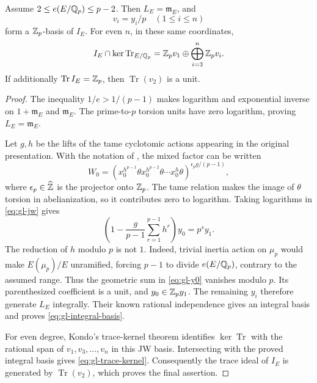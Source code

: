 \begin{lemma}
\label{lem:gl-integral-basis}
Assume $2\le e(E/\mathbb Q_p)\le p-2$. Then
$L_E=\mathfrak m_E$, and
\begin{equation}\label{eq:gl-integral-basis}
 v_i=y_i/p\quad(1\le i\le n)
\end{equation}
form a $\mathbb Z_p$-basis of $I_E$.
For even $n$, in these same coordinates,
\begin{equation}\label{eq:gl-trace-kernel}
 I_E\cap\ker\operatorname{Tr}_{E/\mathbb Q_p}
 =\mathbb Z_pv_1\oplus\bigoplus_{i=3}^n\mathbb Z_pv_i.
\end{equation}
If additionally $\operatorname{Tr} I_E=\mathbb Z_p$, then
$\operatorname{Tr}(v_2)$ is a unit.
\end{lemma}
\begin{proof}
The inequality $1/e>1/(p-1)$ makes logarithm and exponential inverse
on $1+\mathfrak m_E$ and $\mathfrak m_E$. The prime-to-$p$ torsion
units have zero logarithm, proving $L_E=\mathfrak m_E$.

Let $g,h$ be the lifts of the tame cyclotomic actions appearing in
the original presentation. With the notation of
\cite[Proposition~1.1]{HoshiNishio}, the mixed factor can be written
\[
 W_0=
 \left(x_0^{h^{p-1}}\theta x_0^{h^{p-2}}\theta
             \cdots x_0^h\theta\right)^{\epsilon_p g/(p-1)},
\]
where $\epsilon_p\in\widehat{\mathbb Z}$ is the projector onto $\mathbb Z_p$.
The tame relation makes the image of $\theta$ torsion in
abelianization, so it contributes zero to logarithm. Taking
logarithms in \eqref{eq:gl-jw} gives
\begin{equation}\label{eq:gl-y0}
 \left(1-\frac g{p-1}\sum_{r=1}^{p-1}h^r\right)y_0=p^s y_1.
\end{equation}
The reduction of $h$ modulo $p$ is not $1$. Indeed, trivial inertia
action on $\mu_p$ would make $E(\mu_p)/E$ unramified, forcing
$p-1$ to divide $e(E/\mathbb Q_p)$, contrary to the assumed range.
Thus the geometric sum in \eqref{eq:gl-y0} vanishes modulo $p$.
Its parenthesized coefficient is a unit, and
$y_0\in\mathbb Z_p y_1$. The remaining $y_i$ therefore generate $L_E$
integrally. Their known rational independence gives an integral
basis and proves \eqref{eq:gl-integral-basis}.

For even degree, Kondo's trace-kernel theorem
\cite[Theorem~1.3]{KondoGalois} identifies
$\ker\operatorname{Tr}$ with the rational span of
$v_1,v_3,\ldots,v_n$ in this JW basis. Intersecting with the proved
integral basis gives \eqref{eq:gl-trace-kernel}. Consequently the
trace ideal of $I_E$ is generated by $\operatorname{Tr}(v_2)$,
which proves the final assertion.
\end{proof}

